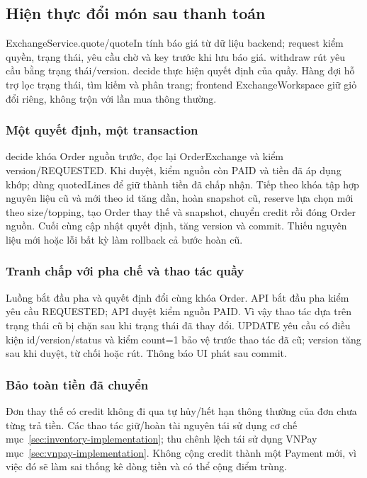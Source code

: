 \subsection{Hiện thực đổi món sau thanh toán}
\label{sec:exchange-implementation}
ExchangeService.quote/quoteIn tính báo giá từ dữ liệu backend; request kiểm quyền, trạng thái, yêu cầu chờ và key trước khi lưu báo giá. withdraw rút yêu cầu bằng trạng thái/version. decide thực hiện quyết định của quầy. Hàng đợi hỗ trợ lọc trạng thái, tìm kiếm và phân trang; frontend ExchangeWorkspace giữ giỏ đổi riêng, không trộn với lần mua thông thường.

\subsubsection{Một quyết định, một transaction}
decide khóa Order nguồn trước, đọc lại OrderExchange và kiểm version/REQUESTED. Khi duyệt, kiểm nguồn còn PAID và tiền đã áp dụng khớp; dùng quotedLines để giữ thành tiền đã chấp nhận. Tiếp theo khóa tập hợp nguyên liệu cũ và mới theo id tăng dần, hoàn snapshot cũ, reserve lựa chọn mới theo size/topping, tạo Order thay thế và snapshot, chuyển credit rồi đóng Order nguồn. Cuối cùng cập nhật quyết định, tăng version và commit. Thiếu nguyên liệu mới hoặc lỗi bất kỳ làm rollback cả bước hoàn cũ.

\subsubsection{Tranh chấp với pha chế và thao tác quầy}
Luồng bắt đầu pha và quyết định đổi cùng khóa Order. API bắt đầu pha kiểm yêu cầu REQUESTED; API duyệt kiểm nguồn PAID. Vì vậy thao tác dựa trên trạng thái cũ bị chặn sau khi trạng thái đã thay đổi. UPDATE yêu cầu có điều kiện id/version/status và kiểm count=1 bảo vệ trước thao tác đã cũ; version tăng sau khi duyệt, từ chối hoặc rút. Thông báo UI phát sau commit.

\subsubsection{Bảo toàn tiền đã chuyển}
Đơn thay thế có credit không đi qua tự hủy/hết hạn thông thường của đơn chưa từng trả tiền. Các thao tác giữ/hoàn tài nguyên tái sử dụng cơ chế mục~\ref{sec:inventory-implementation}; thu chênh lệch tái sử dụng VNPay mục~\ref{sec:vnpay-implementation}. Không cộng credit thành một Payment mới, vì việc đó sẽ làm sai thống kê dòng tiền và có thể cộng điểm trùng.

